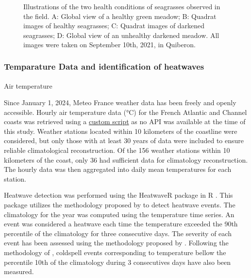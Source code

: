 \documentclass[
  number]{elsarticle}
\makeatletter
\let\oldparagraph\paragraph
\renewcommand{\paragraph}{
    \@ifstar
      \xxxParagraphStar
      \xxxParagraphNoStar
  }
\newcommand{\xxxParagraphStar}[1]{\oldparagraph*{#1}\mbox{}}
\newcommand{\xxxParagraphNoStar}[1]{\oldparagraph{#1}\mbox{}}
\makeatother
\begin{document}
\label{cell-fig-QuiberonImg}
\begin{figure}[H]


\caption{\label{fig-QuiberonImg}Illustrations of the two health
conditions of seagrasses observed in the field. A: Global view of a
healthy green meadow; B: Quadrat images of healthy seagrasses; C:
Quadrat images of darkened seagrasses; D: Global view of an unhealthy
darkened meadow. All images were taken on September 10th, 2021, in
Quiberon.}

\end{figure}%

\subsubsection{Temparature Data and identification of
heatwaves}\label{temparature-data-and-identification-of-heatwaves}

\paragraph{Air temperature}\label{air-temperature}

Since January 1, 2024, Meteo France weather data has been freely and
openly accessible. Hourly air temperature data (°C) for the French
Atlantic and Channel coasts was retrieved using a
\href{https://github.com/SigOiry/HeatWave_Seagrasses/blob/main/Scripts/MeteoFrance_Extraction.qmd}{custom
script} as no API was available at the time of this study. Weather
stations located within 10 kilometers of the coastline were considered,
but only those with at least 30 years of data were included to ensure
reliable climatological reconstruction. Of the 156 weather stations
within 10 kilometers of the coast, only 36 had sufficient data for
climatology reconstruction. The hourly data was then aggregated into
daily mean temperatures for each station.

Heatwave detection was performed using the HeatwaveR package in R
\citep{heatwaveR}. This package utilizes the methodology proposed by
\citep{hobday2016hierarchical} to detect heatwave events. The
climatology for the year was computed using the temperature time series.
An event was considered a heatwave each time the temperature exceeded
the 90th percentile of the climatology for three consecutive days. The
severity of each event has been assessed using the methodology proposed
by \citep{hobday2018categorizing}. Following the methodology of
\citep{schlegel2017nearshore}, coldspell events corresponding to
temperature bellow the percentile 10th of the climatology during 3
consecutives days have also been measured.
\end{document}
